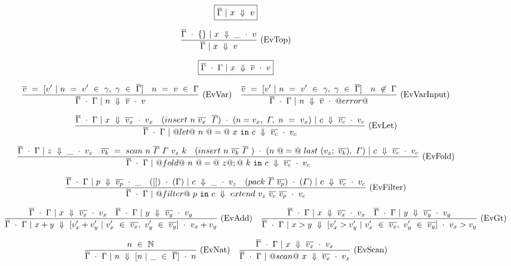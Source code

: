 
\begin{figure*}

$$
\boxed{\ov{\Gamma} ~|~ x ~\Downarrow~ v}
$$

$$
\ruleI
{
    \ov{\Gamma}~\cdot~\{\} ~|~ x ~\Downarrow~ \_ ~\cdot~ v
}
{
    \ov{\Gamma} ~|~ x ~\Downarrow~ v
}
\textrm{(EvTop)}
$$

$$
\boxed{\BigstepG{x}{\ov{v}}{v}}
$$


$$
\ruleI
{
    \ov{v} ~=~ [ v' ~|~ n ~=~ v' ~\in~ \gamma,~ \gamma ~\in~ \ov{\Gamma} ]
    \quad
    n ~=~ v ~\in~ \Gamma
}
{ 
    \BigstepG{n}{\ov{v}}{v}
}
\textrm{(EvVar)}
\quad
\ruleI
{
    \ov{v} ~=~ [ v' ~|~ n ~=~ v' ~\in~ \gamma,~ \gamma ~\in~ \ov{\Gamma} ]
    \quad
    n ~\not\in~ \Gamma
}
{ 
    \BigstepG{n}{\ov{v}}{@error@}
}
\textrm{(EvVarInput)}
$$

$$
\ruleI
{
    \BigstepG{x}{\ov{v_x}}{v_x}
    \quad
    \Bigstep{\BigstepInsert{n}{\ov{v_x}}{~\ov{\Gamma}}}{n=v_x,~\Gamma,~n~=~v_x}{c}{\ov{v_c}}{v_c}
}
{
    \BigstepG{@let@~n~@=@~x~\flowsinto~c}{\ov{v_c}}{v_c}
}
\textrm{(EvLet)}
$$

$$
\ruleI
{
    \BigstepG{z}{\_}{v_z}
    \quad
    \ov{v_k}~=~\mit{scan}~n~\ov{\Gamma}~\Gamma~v_z~k
    \quad
    \Bigstep{\BigstepInsert{n}{\ov{v_k}{~\ov{\Gamma}}}}{n~@=@~\mit{last}~(v_z;~\ov{v_k}),~\Gamma}{c}{\ov{v_c}}{v_c}
}
{
    \BigstepG{@fold@~n~@=@~z@;@~k~\flowsinto~c}{\ov{v_c}}{v_c}
}
\textrm{(EvFold)}
$$

$$
\ruleI
{
    \BigstepG{p}{\ov{v_p}}{\_}
    \quad
    \Bigstep{[]}{\Gamma}{c}{\_}{v_z}
    \quad
    \Bigstep{\mit{pack}~\ov{\Gamma}~\ov{v_p}}{\Gamma}{c}{\ov{v_c}}{v_c}
}
{
    \BigstepG{@filter@~p~\flowsinto~c}{\mit{extend}~v_z~\ov{v_c}~\ov{v_p}}{v_c}
}
\textrm{(EvFilter)}
$$



$$
\ruleI
{
    \BigstepG{x}{\ov{v_x}}{v_x}
    \quad
    \BigstepG{y}{\ov{v_y}}{v_y}
}
{
    \BigstepG{x+y}{[v_x'+v_y'~|~v_x'~\in~\ov{v_x},~v_y'~\in~\ov{v_y}]}{v_x+v_y}
}
\textrm{(EvAdd)}
\quad
\ruleI
{
    \BigstepG{x}{\ov{v_x}}{v_x}
    \quad
    \BigstepG{y}{\ov{v_y}}{v_y}
}
{
    \BigstepG{x>y}{[v_x'>v_y'~|~v_x'~\in~\ov{v_x},~v_y'~\in~\ov{v_y}]}{v_x>v_y}
}
\textrm{(EvGt)}
$$

$$
\ruleI
{
    n~\in~\NN
}
{
    \BigstepG{n}{[n~|~\_~\in~\ov{\Gamma}]}{n}
}
\textrm{(EvNat)}
\quad
\ruleI
{
    \BigstepG{x}{\ov{v_x}}{v_x}
}
{
    \BigstepG{@scan@~x}{\ov{v_x}}{v_x}
}
\textrm{(EvScan)}
$$




\end{figure*}
